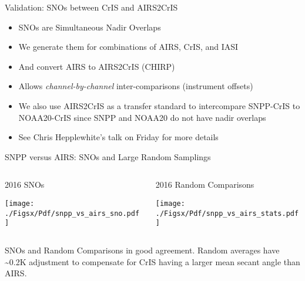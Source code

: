 \documentclass[10pt,t]{beamer}
\begin{document}
\begin{frame}[label={sec:org0b3c9b1}]{Validation: SNOs between CrIS and AIRS2CrIS}
\begin{itemize}
\item SNOs are Simultaneous Nadir Overlaps
\item We generate them for combinations of AIRS, CrIS, and IASI
\item And convert AIRS to AIRS2CrIS (CHIRP)
\item Allows \emph{channel-by-channel} inter-comparisons (instrument offsets)
\item We also use AIRS2CrIS as a transfer standard to intercompare SNPP-CrIS to NOAA20-CrIS since SNPP and NOAA20 do not have nadir overlaps
\item See Chris Hepplewhite's talk on Friday for more details
\end{itemize}
\end{frame}

\begin{frame}[label={sec:orgb58c1c7}]{SNPP versus AIRS: SNOs and Large Random Samplings}
\vspace{-0.3in}

\begin{columns}
\begin{column}{0.55\columnwidth}
\begin{block}{\footnotesize 2016 SNOs}
\vspace{-0.1in}
\begin{center}
\texttt{[image: ./Figsx/Pdf/snpp\_vs\_airs\_sno.pdf]}
\end{center}
\end{block}
\end{column}

\begin{column}{0.55\columnwidth}
\begin{block}{\footnotesize 2016 Random Comparisons}
\vspace{-0.1in}
\begin{center}
\texttt{[image: ./Figsx/Pdf/snpp\_vs\_airs\_stats.pdf]}
\end{center}
\end{block}
\end{column}
\end{columns}

\small
SNOs and Random Comparisons in good agreement.  Random averages have \textasciitilde{}0.2K adjustment to compensate for CrIS having a larger mean secant angle than AIRS.
\end{frame}
\end{document}
